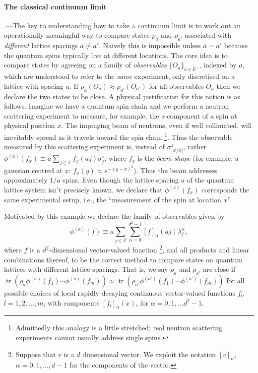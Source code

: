 \documentclass[prl,twocolumn,lengthcheck,superscriptaddress]{revtex4-1}
\newcommand{\tr}{\operatorname{tr}}
\theoremstyle{definition}
\theoremstyle{remark}
\begin{document}
\paragraph{The classical continuum limit}\hspace{-1em}.---The key to understanding how to take a continuum limit is to work out an operationally meaningful way to compare states $\rho_a$ and $\rho_{a'}$ associated with \emph{different} lattice spacings $a\not=a'$. Naively this is impossible unless $a=a'$ because the quantum spins typically live at different locations. The core idea is to compare states by agreeing on a family of \emph{observables} $\{O_a\}_{a\in\mathbb{R}^+}$, indexed by $a$, which are understood to refer to the \emph{same} experiment, only discretised on a lattice with spacing $a$. If $\rho_a(O_a) \approx \rho_{a'}(O_{a'})$ for all observables $O_a$ then we declare the two states to be close. A physical justification for this notion is as follows. Imagine we have a quantum spin chain and we perform a neutron scattering experiment to measure, for example, the $z$-component of a spin at physical position $x$. The impinging beam of neutrons, even if well collimated, will inevitably spread as it travels toward the spin chain \footnote{Admittedly this analogy is a little stretched; real neutron scattering experiments cannot usually address single spins.}. Thus the observable measured by this scattering experiment is, instead of $\sigma^z_{\lfloor x/a \rfloor}$, rather $\phi^{(a)}(f_x) \equiv a\sum_{j\in\mathbb{Z}} f_x(aj) \sigma_j^z$, where $f_x$ is the \emph{beam shape} (for example, a gaussian centred at $x$: $f_x(y) \approx e^{-(y-x)^2}$). Thus the beam addresses approximately $1/a$ spins. Even though the lattice spacing $a$ of the quantum lattice system isn't precisely known, we declare that $\phi^{(a)}(f_x)$ corresponds the same experimental setup, i.e., the ``measurement of the spin at location $x$''. 

Motivated by this example we declare the family of observables given by
\begin{equation}
	\phi^{(a)}(f) \equiv a\sum_{j\in\mathbb{Z}} \sum_{\alpha=0}^{d^2-1} [f]_\alpha(aj) \lambda_j^\alpha,
\end{equation}
where $f$ is a $d^2$-dimensional vector-valued function \footnote{Suppose that $v$ is a $d$ dimensional vector. We exploit the notation $[v]_\alpha$, $\alpha=0,1,\ldots, d-1$ for the components of the vector.}, and all products and linear combinations thereof, to be the correct method to compare states on quantum lattices with different lattice spacings. That is, we say $\rho_a$ and $\rho_{a'}$ are close if $\tr(\rho_a \phi^{(a)}(f_1)\cdots \phi^{(a)}(f_m)) \approx \tr(\rho_{a'} \phi^{(a')}(f_1)\cdots \phi^{(a')}(f_m))$ for all possible choices of local rapidly decaying continuous vector-valued functions $f_l$, $l= 1, 2, \ldots, m$, with components $[f_l]_{\alpha}(x)$, for $\alpha = 0, 1, \ldots d^2-1$.
\end{document}
